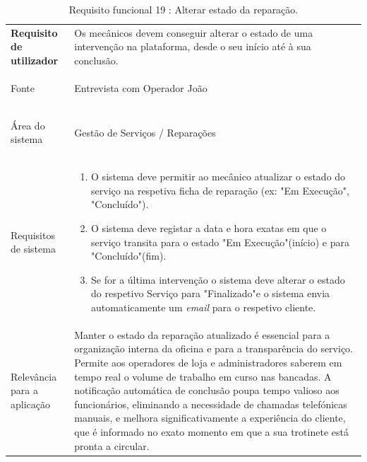 \documentclass[a4paper,12pt]{scrreprt}
\begin{document}
\begin{table}[H]
    \centering
    \renewcommand{\arraystretch}{1.5} 
    
    \begin{tabular}{|>{\columncolor{gray!15}\bfseries}p{4cm}|p{10.5cm}|}
        \hline
        Requisito de utilizador & Os mecânicos devem conseguir alterar o estado de uma intervenção na plataforma, desde o seu início até à sua conclusão. \\ \hdashline
        
        Fonte & Entrevista com Operador João \\ \hdashline
        
        Área do sistema & Gestão de Serviços / Reparações \\ \hdashline
        
        Requisitos de sistema & 
        \begin{enumerate}[leftmargin=*, nosep, topsep=2pt, partopsep=0pt]
            \item O sistema deve permitir ao mecânico atualizar o estado do serviço na respetiva ficha de reparação (ex: "Em Execução", "Concluído").
            \item O sistema deve registar a data e hora exatas em que o serviço transita para o estado "Em Execução"\space (início) e para "Concluído"\space (fim).
            \item Se for a última intervenção o sistema deve alterar o estado do respetivo Serviço para "Finalizado"\space e o sistema envia automaticamente um \textit{email} para o respetivo cliente.
        \end{enumerate} \\ \hdashline
        
        Relevância para a aplicação & Manter o estado da reparação atualizado é essencial para a organização interna da oficina e para a transparência do serviço. Permite aos operadores de loja e administradores saberem em tempo real o volume de trabalho em curso nas bancadas. A notificação automática de conclusão poupa tempo valioso aos funcionários, eliminando a necessidade de chamadas telefónicas manuais, e melhora significativamente a experiência do cliente, que é informado no exato momento em que a sua trotinete está pronta a circular.\\ \hline
    \end{tabular}
    \caption{Requisito funcional 19 : Alterar estado da reparação.}
    \label{tab:rf_alterar_estado}
\end{table}
\end{document}
